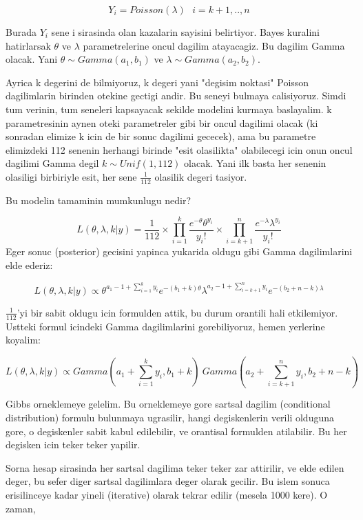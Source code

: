 \documentclass[12pt,fleqn]{article}
\begin{document}
\[ Y_i = Poisson(\lambda) \ \ \ i=k+1,..,n \]

Burada $Y_i$ sene i sirasinda olan kazalarin sayisini belirtiyor. Bayes kuralini
hatirlarsak $\theta$ ve $\lambda$ parametrelerine oncul dagilim atayacagiz. Bu
dagilim Gamma olacak. Yani $\theta \sim Gamma(a_1, b_1)$ ve $\lambda \sim
Gamma(a_2, b_2)$.

Ayrica k degerini de bilmiyoruz, k degeri yani "degisim noktasi" Poisson
dagilimlarin birinden otekine gectigi andir. Bu seneyi bulmaya
calisiyoruz. Simdi tum verinin, tum seneleri kapsayacak sekilde modelini kurmaya
baslayalim. k parametresinin aynen oteki parametreler gibi bir oncul dagilimi
olacak (ki sonradan elimize k icin de bir sonuc dagilimi gececek), ama bu
parametre elimizdeki 112 senenin herhangi birinde "esit olasilikta" olabilecegi
icin onun oncul dagilimi Gamma degil $k \sim Unif(1,112)$ olacak. Yani ilk basta
her senenin olasiligi birbiriyle esit, her sene $\frac{1}{112}$ olasilik degeri
tasiyor.

Bu modelin tamaminin mumkunlugu nedir?

\[ L(\theta, \lambda, k | y) = \frac{1}{112} \times \displaystyle \prod_{i=1}^k
\frac{e^{-\theta}\theta^{y_i}}{y_i!}  \times \displaystyle \prod_{i=k+1}^n
\frac{e^{-\lambda}\lambda^{y_i}}{y_i!} 
 \]
Eger sonuc (posterior) gecisini yapinca yukarida oldugu gibi Gamma dagilimlarini
elde ederiz:

\[ L(\theta, \lambda, k | y)  \propto 
\theta^{a_1-1+\sum_{i=1}^{k} y_i}e^{-(b_1+k)\theta} 
\lambda^{a_2-1+\sum_{i=k+1}^n y_i}e^{-(b_2+n-k)\lambda} 
 \]

$\frac{1}{112}$'yi bir sabit oldugu icin formulden attik, bu durum orantili hali
etkilemiyor. Ustteki formul icindeki Gamma dagilimlarini gorebiliyoruz, hemen
yerlerine koyalim:

\[ L(\theta, \lambda, k | y)  \propto 
Gamma(a_1 + \sum_{i=1}^{k} y_i, b_1+k) \
Gamma(a_2 + \sum_{i=k+1}^{n} y_i, b_2+n-k)
 \]

Gibbs orneklemeye gelelim. Bu orneklemeye gore sartsal dagilim (conditional
distribution) formulu bulunmaya ugrasilir, hangi degiskenlerin verili olduguna
gore, o degiskenler sabit kabul edilebilir, ve orantisal formulden
atilabilir. Bu her degisken icin teker teker yapilir. 

Sorna hesap sirasinda her sartsal dagilima teker teker zar attirilir, ve elde
edilen deger, bu sefer diger sartsal dagilimlara deger olarak gecilir. Bu islem
sonuca erisilinceye kadar yineli (iterative) olarak tekrar edilir (mesela 1000
kere). O zaman,
\end{document}
